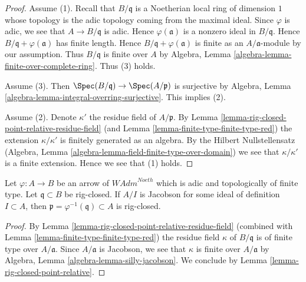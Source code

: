 \begin{proof}
Assume (1). Recall that $B/\mathfrak q$ is a Noetherian local ring
of dimension $1$ whose topology is the adic topology coming
from the maximal ideal. Since $\varphi$ is adic, we see that
$A \to B/\mathfrak q$ is adic. Hence $\varphi(\mathfrak a)$
is a nonzero ideal in $B/\mathfrak q$. Hence
$B/\mathfrak q + \varphi(\mathfrak a)$
has finite length. Hence $B/\mathfrak q + \varphi(\mathfrak a)$
is finite as an $A/\mathfrak a$-module by our assumption.
Thus $B/\mathfrak q$ is finite over $A$ by
Algebra, Lemma \ref{algebra-lemma-finite-over-complete-ring}.
Thus (3) holds.

\medskip\noindent
Assume (3). Then $\Spec(B/\mathfrak q) \to \Spec(A/\mathfrak p)$
is surjective by
Algebra, Lemma \ref{algebra-lemma-integral-overring-surjective}.
This implies (2).

\medskip\noindent
Assume (2). Denote $\kappa'$ the residue field of $A/\mathfrak p$.
By Lemma \ref{lemma-rig-closed-point-relative-residue-field}
(and Lemma \ref{lemma-finite-type-finite-type-red})
the extension $\kappa/\kappa'$ is finitely generated as an algebra.
By the Hilbert Nullstellensatz (Algebra, Lemma
\ref{algebra-lemma-field-finite-type-over-domain})
we see that $\kappa/\kappa'$ is a finite extension.
Hence we see that (1) holds.
\end{proof}

\begin{lemma}
\label{lemma-rig-closed-jacobson}
Let $\varphi : A \to B$ be an arrow of $\textit{WAdm}^{Noeth}$
which is adic and topologically of finite type.
Let $\mathfrak q \subset B$ be rig-closed.
If $A/I$ is Jacobson for some ideal of definition $I \subset A$, then
$\mathfrak p = \varphi^{-1}(\mathfrak q) \subset A$
is rig-closed.
\end{lemma}

\begin{proof}
By Lemma \ref{lemma-rig-closed-point-relative-residue-field}
(combined with Lemma \ref{lemma-finite-type-finite-type-red})
the residue field $\kappa$ of $B/\mathfrak q$ is of finite type over
$A/\mathfrak a$. Since $A/\mathfrak a$ is Jacobson, we
see that $\kappa$ is finite over $A/\mathfrak a$ by
Algebra, Lemma \ref{algebra-lemma-silly-jacobson}.
We conclude by Lemma \ref{lemma-rig-closed-point-relative}.
\end{proof}

